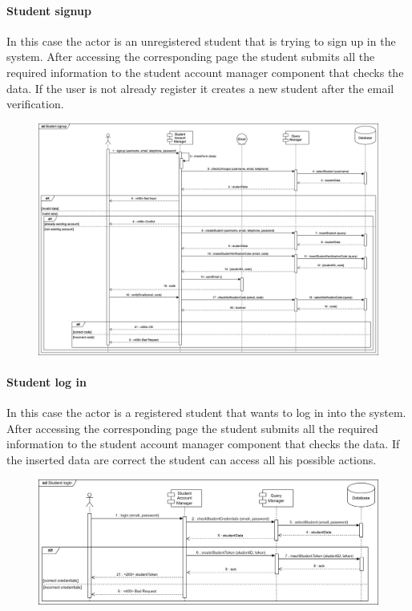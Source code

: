 \documentclass[12pt, a4paper]{report}
\begin{document}
    \paragraph*{Student signup}
    In this case the actor is an unregistered student that is trying to sign up in the system.
    After accessing the corresponding page the student submits all the required information to the student account manager component that checks the data. 
    If the user is not already register it creates a new student after the email verification. 
    \begin{figure}[H]
        \centering
        \includegraphics[width=1.0\linewidth]{images/ssrv.png}
    \end{figure}

    \paragraph*{Student log in}
    In this case the actor is a registered student that wants to log in into the system. 
    After accessing the corresponding page the student submits all the required information to the student account manager component that checks the data. 
    If the inserted data are correct the student can access all his possible actions. 
    \begin{figure}[H]
        \centering
        \includegraphics[width=1.0\linewidth]{images/slrv.png}
    \end{figure}
\end{document}
